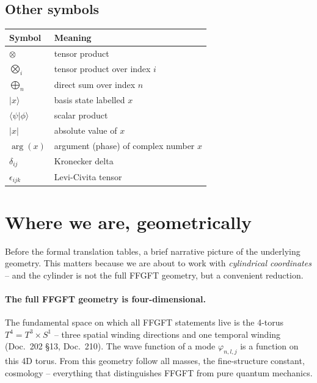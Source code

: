 \subsection*{Other symbols}

\begin{center}
\renewcommand{\arraystretch}{1.3}
{\small
\begin{tabular}{>{\raggedright\arraybackslash}p{2.5cm}>{\raggedright\arraybackslash}p{8.5cm}}
\toprule
\textbf{Symbol} & \textbf{Meaning} \\
\midrule
$\otimes$ & tensor product \\
$\bigotimes_i$ & tensor product over index $i$ \\
$\bigoplus_n$ & direct sum over index $n$ \\
$|x\rangle$ & basis state labelled $x$ \\
$\langle\psi|\phi\rangle$ & scalar product \\
$|x|$ & absolute value of $x$ \\
$\arg(x)$ & argument (phase) of complex number $x$ \\
$\delta_{ij}$ & Kronecker delta \\
$\epsilon_{ijk}$ & Levi-Civita tensor \\
\bottomrule
\end{tabular}
}
\renewcommand{\arraystretch}{1.0}
\end{center}

\section*{Where we are, geometrically}

Before the formal translation tables, a brief narrative picture of
the underlying geometry. This matters because we are about to work
with \emph{cylindrical coordinates} -- and the cylinder is not the
full FFGFT geometry, but a convenient reduction.

\paragraph{The full FFGFT geometry is four-dimensional.}
The fundamental space on which all FFGFT statements live is the
4-torus $T^4 = T^3 \times S^1$ -- three spatial winding directions
and one temporal winding (Doc.~202 §13, Doc.~210). The wave
function of a mode $\varphi_{n,l,j}$ is a function on this 4D
torus. From this geometry follow all masses, the fine-structure
constant, cosmology -- everything that distinguishes FFGFT from
pure quantum mechanics.

